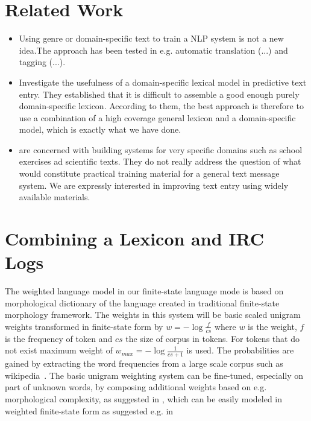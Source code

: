 \documentclass[a4paper,conference]{IEEEtran}
\begin{document}
\section{Related Work}
\label{sec:related-work}

\begin{itemize}
\item Using genre or domain-specific text to train a NLP system is not
  a new idea.The approach has been tested in e.g. automatic
  translation (...) and tagging (...).
\item \cite{Harbusch/2003} Investigate the usefulness of a
  domain-specific lexical model in predictive text entry. They
  established that it is difficult to assemble a good enough purely
  domain-specific lexicon. According to them, the best approach is
  therefore to use a combination of a high coverage general lexicon
  and a domain-specific model, which is exactly what we have done.
\item \cite{Harbusch/2003} are concerned with building systems for very
  specific domains such as school exercises ad scientific texts. They
  do not really address the question of what would constitute
  practical training material for a general text message system. We
  are expressly interested in improving text entry using widely
  available materials.
\end{itemize}

\section{Combining a Lexicon and IRC Logs}
\label{sec:methods}

The weighted language model in our finite-state language mode is based
on morphological dictionary of the language created in traditional
finite-state morphology framework\cite{beesley/2003}. The weights in
this system will be basic scaled unigram weights transformed in
finite-state form by $w = -\log \frac{f}{cs}$ where $w$ is the weight,
$f$ is the frequency of token and $cs$ the size of corpus in
tokens. For tokens that do not exist maximum weight of $w_{max} =
-\log \frac{1}{cs+1}$ is used.  The probabilities are gained by
extracting the word frequencies from a large scale corpus such as
wikipedia~\cite{pirinen/2010/lrec}. The basic unigram weighting system
can be fine-tuned, especially on part of unknown words, by composing
additional weights based on e.g. morphological complexity, as
suggested in \cite{karlsson/1992}, which can be easily modeled in
weighted finite-state form as suggested e.g. in\cite{schiller/2005}
\end{document}
